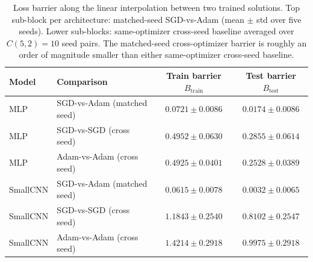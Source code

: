 \begin{table}[H]
\centering
\small
\begin{tabular}{llcc}
\toprule
\textbf{Model} & \textbf{Comparison} & \textbf{Train barrier $B_{\text{train}}$} & \textbf{Test barrier $B_{\text{test}}$} \\
\midrule
MLP      & SGD-vs-Adam (matched seed)   & $0.0721 \pm 0.0086$ & $0.0174 \pm 0.0086$ \\
MLP      & SGD-vs-SGD (cross seed)      & $0.4952 \pm 0.0630$ & $0.2855 \pm 0.0614$ \\
MLP      & Adam-vs-Adam (cross seed)    & $0.4925 \pm 0.0401$ & $0.2528 \pm 0.0389$ \\
\addlinespace
SmallCNN & SGD-vs-Adam (matched seed)   & $0.0615 \pm 0.0078$ & $0.0032 \pm 0.0065$ \\
SmallCNN & SGD-vs-SGD (cross seed)      & $1.1843 \pm 0.2540$ & $0.8102 \pm 0.2547$ \\
SmallCNN & Adam-vs-Adam (cross seed)    & $1.4214 \pm 0.2918$ & $0.9975 \pm 0.2918$ \\
\bottomrule
\end{tabular}
\caption{Loss barrier along the linear interpolation between two trained solutions. Top sub-block per architecture: matched-seed SGD-vs-Adam (mean $\pm$ std over five seeds). Lower sub-blocks: same-optimizer cross-seed baseline averaged over $C(5,2)=10$ seed pairs. The matched-seed cross-optimizer barrier is roughly an order of magnitude smaller than either same-optimizer cross-seed baseline.}
\label{tab:mode-connectivity}
\end{table}


